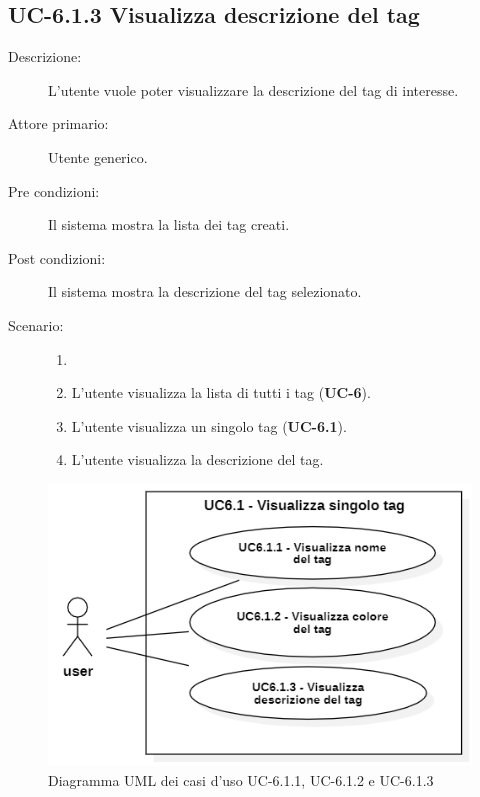 \subsection{UC-6.1.3 Visualizza descrizione del tag}
\begin{description}
    \item[Descrizione:] L’utente vuole poter visualizzare la descrizione del tag di interesse.
    \item[Attore primario:] Utente generico.
    \item[Pre condizioni:] Il sistema mostra la lista dei tag creati.
    \item[Post condizioni:] Il sistema mostra la descrizione del tag selezionato.
    \item[Scenario:]
    \begin{enumerate}
        \item[]
        \item L’utente visualizza la lista di tutti i tag (\textbf{UC-6}).
        \item L'utente visualizza un singolo tag (\textbf{UC-6.1}).
        \item L'utente visualizza la descrizione del tag.
    \end{enumerate}
\end{description}

\begin{figure}[H]
    \centering
    \includegraphics[width=0.8\linewidth]{UC6.1.1-2-3.png} %
    \caption{Diagramma UML dei casi d'uso UC-6.1.1, UC-6.1.2 e UC-6.1.3}
    \label{fig:UC8.1.1-2-3}
\end{figure}

